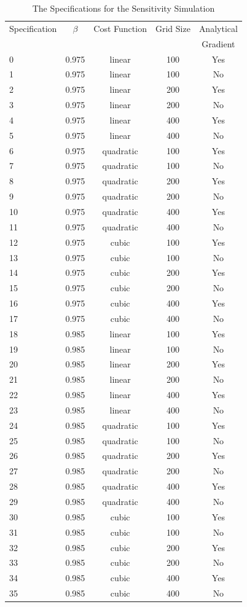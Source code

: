 \begin{table}[H]
	\centering
	\caption{The Specifications for the Sensitivity Simulation}
	\label{table4}
	\begin{tabular}{l c c c c}
		\toprule\midrule
		Specification & $\beta$ & Cost Function & Grid Size & Analytical \\
		& & & & Gradient \\ \midrule
		0 & 0.975 & linear& 100& Yes\\
		1&0.975& linear& 100& No\\
		2&0.975& linear& 200& Yes\\
		3&0.975& linear& 200& No\\
		4&0.975& linear& 400& Yes\\
		5&0.975& linear& 400& No\\
		6&0.975& quadratic& 100& Yes\\
		7&0.975& quadratic& 100& No\\
		8&0.975& quadratic& 200& Yes\\
		9&0.975& quadratic& 200& No\\
		10&0.975& quadratic& 400& Yes\\
		11&0.975& quadratic& 400& No\\
		12&0.975& cubic& 100& Yes\\
		13&0.975& cubic& 100& No\\
		14&0.975& cubic& 200& Yes\\
		15&0.975& cubic& 200& No\\
		16&0.975& cubic& 400& Yes\\
		17&0.975& cubic& 400& No\\
		18&0.985& linear& 100& Yes\\
		19&0.985& linear& 100& No\\
		20&0.985& linear& 200& Yes\\
		21&0.985& linear& 200& No\\
		22&0.985& linear& 400& Yes\\
		23&0.985& linear& 400& No\\
		24&0.985& quadratic& 100& Yes\\
		25&0.985& quadratic& 100& No\\
		26&0.985& quadratic& 200& Yes\\
		27&0.985& quadratic& 200& No\\
		28&0.985& quadratic& 400& Yes\\
		29&0.985& quadratic& 400& No\\
		30&0.985& cubic& 100& Yes\\
		31&0.985& cubic& 100& No\\
		32&0.985& cubic& 200& Yes\\
		33&0.985& cubic& 200& No\\
		34&0.985& cubic& 400& Yes\\
		35&0.985& cubic& 400& No\\
		\bottomrule
	\end{tabular}
\end{table}


